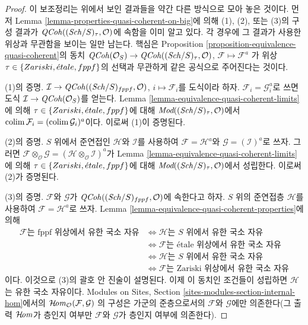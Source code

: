 \begin{proof}
이 보조정리는 위에서 보인 결과들을 약간 다른 방식으로 모아 놓은 것이다.
먼저 Lemma \ref{lemma-properties-quasi-coherent-on-big}에 의해 (1), (2),
또는 (3)의 구성 결과가 $\mathit{QCoh}((\mathit{Sch}/S)_\tau, \mathcal{O})$에 속함을
이미 알고 있다. 각 경우에 그 결과가 사용한 위상과 무관함을 보이는 일만
남는다. 핵심은 Proposition
\ref{proposition-equivalence-quasi-coherent}의 동치
$\mathit{QCoh}(\mathcal{O}_S) \to \mathit{QCoh}((\mathit{Sch}/S)_\tau, \mathcal{O})$,
$\mathcal{F} \mapsto \mathcal{F}^a$
가 위상 $\tau \in \{Zariski, {\acute{e}tale}, fppf\}$의 선택과 무관하게
같은 공식으로 주어진다는 것이다.

\medskip\noindent
(1)의 증명. $\mathcal{I} \to \mathit{QCoh}((\mathit{Sch}/S)_{fppf}, \mathcal{O})$,
$i \mapsto \mathcal{F}_i$를 도식이라 하자.
$\mathcal{F}_i = \mathcal{G}_i^a$로 쓰면 도식
$\mathcal{I} \to \mathit{QCoh}(\mathcal{O}_S)$를 얻는다. Lemma
\ref{lemma-equivalence-quasi-coherent-limits}에 의해
$\tau \in \{Zariski, {\acute{e}tale}, fppf\}$에 대해
$\textit{Mod}((\mathit{Sch}/S)_\tau, \mathcal{O})$에서
$\mathop{\mathrm{colim}}\nolimits \mathcal{F}_i = (\mathop{\mathrm{colim}}\nolimits \mathcal{G}_i)^a$이다.
이로써 (1)이 증명된다.

\medskip\noindent
(2)의 증명. $S$ 위에서 준연접인 $\mathcal{H}$와 $\mathcal{I}$를 사용하여
$\mathcal{F} = \mathcal{H}^a$와 $\mathcal{G} = (\mathcal{I})^a$로 쓰자.
그러면
$\mathcal{F} \otimes_\mathcal{O} \mathcal{G} =
(\mathcal{H} \otimes_\mathcal{O} \mathcal{I})^a$가 Lemma
\ref{lemma-equivalence-quasi-coherent-limits}에 의해
$\tau \in \{Zariski, {\acute{e}tale}, fppf\}$에 대해
$\textit{Mod}((\mathit{Sch}/S)_\tau, \mathcal{O})$에서 성립한다.
이로써 (2)가 증명된다.

\medskip\noindent
(3)의 증명. $\mathcal{F}$와 $\mathcal{G}$가
$\mathit{QCoh}((\mathit{Sch}/S)_{fppf}, \mathcal{O})$에 속한다고 하자. $S$ 위의 준연접층
$\mathcal{H}$를 사용하여 $\mathcal{F} = \mathcal{H}^a$로 쓰자.
Lemma \ref{lemma-equivalence-quasi-coherent-properties}에 의해
\begin{align*}
\mathcal{F}\text{는 fppf 위상에서 유한 국소 자유}
& \Leftrightarrow
\mathcal{H}\text{는 }S\text{ 위에서 유한 국소 자유} \\
& \Leftrightarrow
\mathcal{F}\text{는 \'etale 위상에서 유한 국소 자유} \\
& \Leftrightarrow
\mathcal{H}\text{는 }S\text{ 위에서 유한 국소 자유} \\
& \Leftrightarrow
\mathcal{F}\text{는 Zariski 위상에서 유한 국소 자유}
\end{align*}
이다. 이것으로 (3)의 괄호 안 진술이 설명된다. 이제 이 동치인 조건들이
성립하면 $\mathcal{H}$는 유한 국소 자유이다. Modules on Sites, Section
\ref{sites-modules-section-internal-hom}에서의
$\mathop{\mathcal{H}\!\mathit{om}}\nolimits_\mathcal{O}(\mathcal{F}, \mathcal{G})$
의 구성은 가군의 준층으로서의 $\mathcal{F}$와 $\mathcal{G}$에만
의존한다(그 출력 $\mathop{\mathcal{H}\!\mathit{om}}\nolimits$가 층인지 여부만 $\mathcal{F}$와
$\mathcal{G}$가 층인지 여부에 의존한다).
\end{proof}










